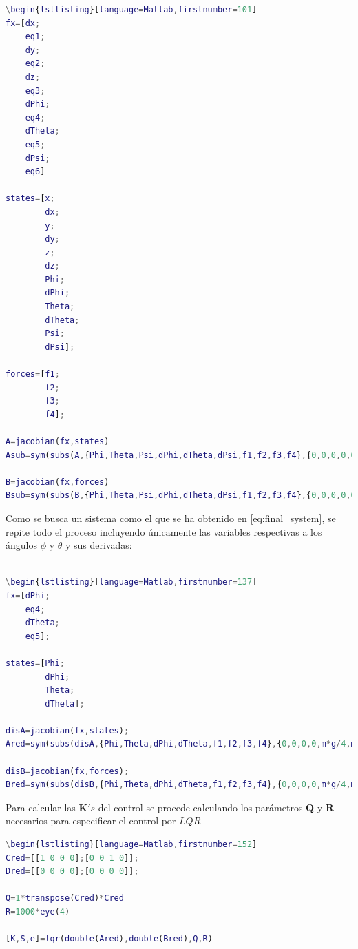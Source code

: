 \documentclass[twoside,11pt]{book}
\begin{document}
\singlespacing
\begin{lstlisting}[language=Matlab,firstnumber=100]
\begin{lstlisting}[language=Matlab,firstnumber=101]
fx=[dx;
    eq1;
    dy;
    eq2;
    dz;
    eq3;
    dPhi;
    eq4;
    dTheta;
    eq5;
    dPsi;
    eq6]

states=[x;
        dx;
        y;
        dy;
        z;
        dz;
        Phi;
        dPhi;
        Theta;
        dTheta;
        Psi;
        dPsi];

forces=[f1;
        f2;
        f3;
        f4];  
        
A=jacobian(fx,states)
Asub=sym(subs(A,{Phi,Theta,Psi,dPhi,dTheta,dPsi,f1,f2,f3,f4},{0,0,0,0,0,0,m*g/4,m*g/4,m*g/4,m*g/4}))

B=jacobian(fx,forces)
Bsub=sym(subs(B,{Phi,Theta,Psi,dPhi,dTheta,dPsi,f1,f2,f3,f4},{0,0,0,0,0,0,m*g/4,m*g/4,m*g/4,m*g/4}))        
\end{lstlisting}
\onehalfspacing

Como se busca un sistema como el que se ha obtenido en \ref{eq:final_system}, se repite todo el proceso incluyendo únicamente las variables respectivas a los ángulos $\phi$ y $\theta$ y sus derivadas:

\singlespacing
\begin{lstlisting}[language=Matlab,firstnumber=136]

\begin{lstlisting}[language=Matlab,firstnumber=137]
fx=[dPhi;
    eq4;
    dTheta;
    eq5];

states=[Phi;
        dPhi;
        Theta;
        dTheta];
        
disA=jacobian(fx,states);
Ared=sym(subs(disA,{Phi,Theta,dPhi,dTheta,f1,f2,f3,f4},{0,0,0,0,m*g/4,m*g/4,m*g/4,m*g/4}))

disB=jacobian(fx,forces);
Bred=sym(subs(disB,{Phi,Theta,dPhi,dTheta,f1,f2,f3,f4},{0,0,0,0,m*g/4,m*g/4,m*g/4,m*g/4}))        
\end{lstlisting}
\onehalfspacing

Para calcular las $\mathbf{K}'s$ del control se procede calculando los parámetros $\mathbf{Q}$ y $\mathbf{R}$ necesarios para especificar el control por $LQR$

\singlespacing
\begin{lstlisting}[language=Matlab,firstnumber=151]
\begin{lstlisting}[language=Matlab,firstnumber=152]
Cred=[[1 0 0 0];[0 0 1 0]];
Dred=[[0 0 0 0];[0 0 0 0]];

Q=1*transpose(Cred)*Cred
R=1000*eye(4)

[K,S,e]=lqr(double(Ared),double(Bred),Q,R)
\end{lstlisting}
\newpage
\end{document}
